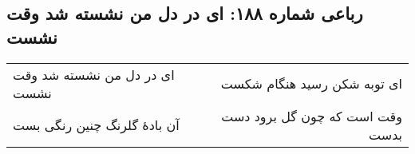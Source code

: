 \begin{center}
\section*{رباعی شماره ۱۸۸: ای در دل من نشسته شد وقت نشست}
\label{sec:0188}
\begin{longtable}{l p{0.5cm} r}
ای در دل من نشسته شد وقت نشست
&&
ای توبه شکن رسید هنگام شکست
\\
آن بادهٔ گلرنگ چنین رنگی بست
&&
وقت است که چون گل برود دست بدست
\\
\end{longtable}
\end{center}

